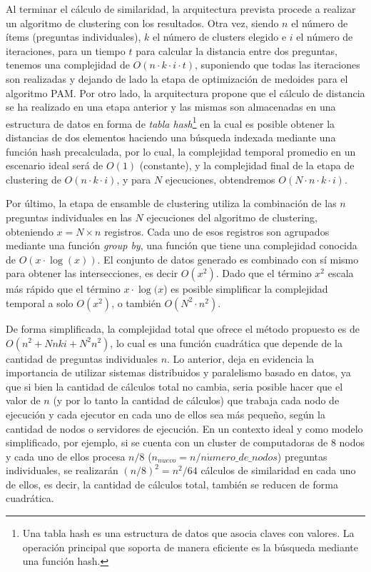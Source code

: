 \bigskip Al terminar el cálculo de similaridad, la arquitectura prevista procede a realizar un algoritmo de clustering con los resultados. Otra vez, siendo \(n\) el número de ítems (preguntas individuales), \(k\) el número de clusters elegido e \(i\) el número de iteraciones, para un tiempo \(t\) para calcular la distancia entre dos preguntas, tenemos una complejidad de \(O(n \cdot k \cdot i \cdot t)\), suponiendo que todas las iteraciones son realizadas y dejando de lado la etapa de optimización de medoides para el algoritmo PAM. Por otro lado, la arquitectura propone que el cálculo de distancia se ha realizado en una etapa anterior y las mismas son almacenadas en una estructura de datos en forma de \textit{tabla hash}\footnote{Una tabla hash es una estructura de datos que asocia claves con valores. La operación principal que soporta de manera eficiente es la búsqueda mediante una función hash.} en la cual es posible obtener la distancias de dos elementos haciendo una búsqueda indexada mediante una función hash precalculada, por lo cual, la complejidad temporal promedio en un escenario ideal será de \(O(1)\) (constante), y la complejidad final de la etapa de clustering de \(O(n \cdot k \cdot i)\), y para \(N\) ejecuciones, obtendremos \(O(N \cdot n \cdot k \cdot i)\).

\bigskip Por último, la etapa de ensamble de clustering utiliza la combinación de las \(n\) preguntas individuales en las \(N\) ejecuciones del algoritmo de clustering, obteniendo \(x = N \times n\) registros. Cada uno de esos registros son agrupados mediante una función \textit{group by}, una función que tiene una complejidad conocida de  \(O(x \cdot \log(x))\). El conjunto de datos generado es combinado con sí mismo para obtener las intersecciones, es decir \(O(x^2)\). Dado que el término \(x^2\) escala más rápido que el término \(x \cdot \log(x\)) es posible simplificar la complejidad temporal a solo \(O(x^2)\), o también \(O(N^2 \cdot n^2)\).

\bigskip De forma simplificada, la complejidad total que ofrece el método propuesto es de \(O(n^2 + Nnki + N^2n^2)\), lo cual es una función cuadrática que depende de la cantidad de preguntas individuales \(n\). Lo anterior, deja en evidencia la importancia de utilizar sistemas distribuidos y paralelismo basado en datos, ya que si bien la cantidad de cálculos total no cambia, seria posible hacer que el valor de \(n\) (y por lo tanto la cantidad de cálculos) que trabaja cada nodo de ejecución y cada ejecutor en cada uno de ellos sea más pequeño, según la cantidad de nodos o servidores de ejecución. En un contexto ideal y como modelo simplificado, por ejemplo, si se cuenta con un cluster de computadoras de \(8\) nodos y cada uno de ellos procesa \(n/8\) (\(n_{nuevo}=n / n\acute{u}mero\_de\_nodos\)) preguntas individuales, se realizarán \((n/8)^2=n^2/64\) cálculos de similaridad en cada uno de ellos, es decir, la cantidad de cálculos total, también se reducen de forma cuadrática.


